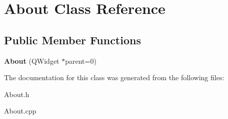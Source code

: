 \hypertarget{classAbout}{\section{\-About \-Class \-Reference}
\label{classAbout}
}
\subsection*{\-Public \-Member \-Functions}
\begin{DoxyCompactItemize}
\item 
\hypertarget{classAbout_ab79599ebbcdeffe0a96e00f010e64177}{{\bfseries \-About} (\-Q\-Widget $\ast$parent=0)}\label{classAbout_ab79599ebbcdeffe0a96e00f010e64177}

\end{DoxyCompactItemize}


\-The documentation for this class was generated from the following files\-:\begin{DoxyCompactItemize}
\item 
\-About.\-h\item 
\-About.\-cpp\end{DoxyCompactItemize}
